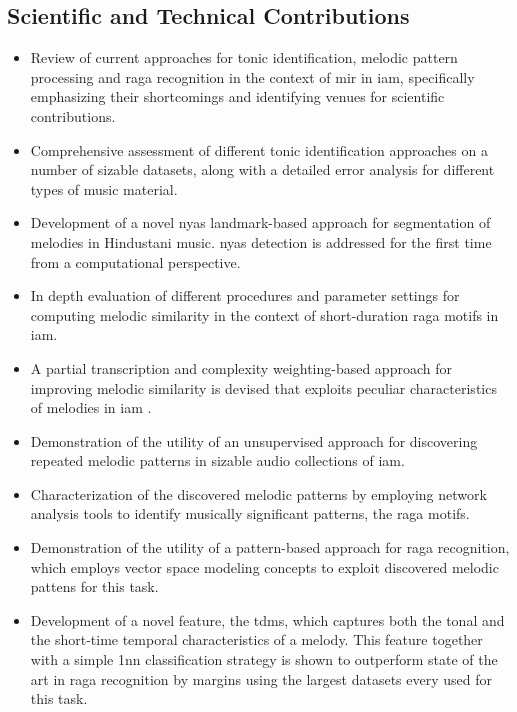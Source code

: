 \subsection*{Scientific and Technical Contributions}

\begin{itemize}
	\item Review of current approaches for tonic identification, melodic pattern processing and \gls{raga} recognition in the context of \gls{mir} in \gls{iam}, specifically emphasizing their shortcomings and identifying venues for scientific contributions. 
	\item Comprehensive assessment of different tonic identification approaches on a number of sizable datasets,  along with a detailed error analysis for different types of music material.
	\item Development of a novel \gls{nyas} landmark-based approach for segmentation of melodies in Hindustani music. \Gls{nyas} detection is addressed for the first time from a computational perspective.
	\item In depth evaluation of different procedures and parameter settings for computing melodic similarity in the context of short-duration \gls{raga} motifs in \gls{iam}. 
	\item A partial transcription and complexity weighting-based approach for improving melodic similarity is devised that exploits peculiar characteristics of melodies in \gls{iam} .
	\item Demonstration of the utility of an unsupervised approach for discovering repeated melodic patterns in sizable audio collections of \gls{iam}.
	\item Characterization of the discovered melodic patterns by employing network analysis tools to identify musically significant patterns, the \gls{raga} motifs. 
	\item Demonstration of the utility of a pattern-based approach for \gls{raga} recognition, which employs vector space modeling concepts to exploit discovered melodic pattens for this task. 
	\item Development of  a novel feature, the \acrfull{tdms}, which captures both the tonal and the short-time temporal characteristics of a melody. This feature together with a simple \gls{1nn} classification strategy is shown to outperform state of the art in \gls{raga} recognition by margins using the largest datasets every used for this task. 
\end{itemize}

